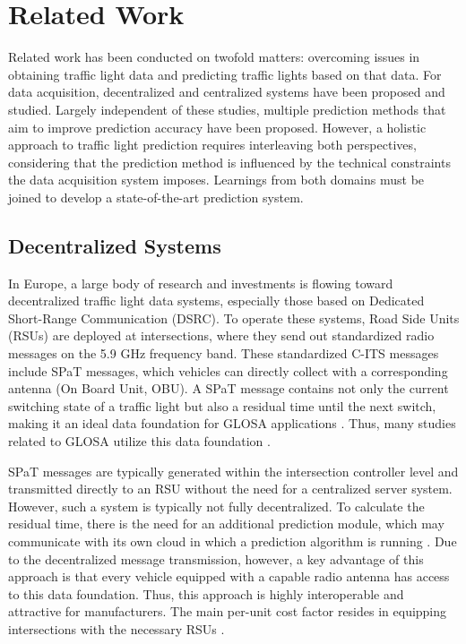 \section{Related Work}

Related work has been conducted on twofold matters: overcoming issues in obtaining traffic light data and predicting traffic lights based on that data. For data acquisition, decentralized and centralized systems have been proposed and studied. Largely independent of these studies, multiple prediction methods that aim to improve prediction accuracy have been proposed. However, a holistic approach to traffic light prediction requires interleaving both perspectives, considering that the prediction method is influenced by the technical constraints the data acquisition system imposes. Learnings from both domains must be joined to develop a state-of-the-art prediction system.

\subsection{Decentralized Systems}

In Europe, a large body of research and investments is flowing toward decentralized traffic light data systems, especially those based on Dedicated Short-Range Communication (DSRC). To operate these systems, Road Side Units (RSUs) are deployed at intersections, where they send out standardized radio messages on the 5.9 GHz frequency band. These standardized C-ITS messages include SPaT messages, which vehicles can directly collect with a corresponding antenna (On Board Unit, OBU). A SPaT message contains not only the current switching state of a traffic light but also a residual time until the next switch, making it an ideal data foundation for GLOSA applications \cite{ibrahim_estimating_2019}. Thus, many studies related to GLOSA utilize this data foundation \cite{schweiger_elisatm_2011, rakha_eco-driving_2011, rakha_aeris_2012, li_open_2012, suramardhana_driver-centric_2014, xu_bb_2015, bernais_design_2016, nguyen_efficient_2016, choudhury_integrated_2016, stahlmann_multi-hop_2017, stahlmann_exploring_2018, plianos_predictive_2018, zhang_green_2020, chen_developing_2022}.

SPaT messages are typically generated within the intersection controller level \cite{zweck_traffic_2013} and transmitted directly to an RSU without the need for a centralized server system. However, such a system is typically not fully decentralized. To calculate the residual time, there is the need for an additional prediction module, which may communicate with its own cloud in which a prediction algorithm is running \cite{strobl_c-its_2019, neuner_leitfaden_2020}. Due to the decentralized message transmission, however, a key advantage of this approach is that every vehicle equipped with a capable radio antenna has access to this data foundation. Thus, this approach is highly interoperable and attractive for manufacturers. The main per-unit cost factor resides in equipping intersections with the necessary RSUs \cite{niebel_cost-benefit-based_2013}.

